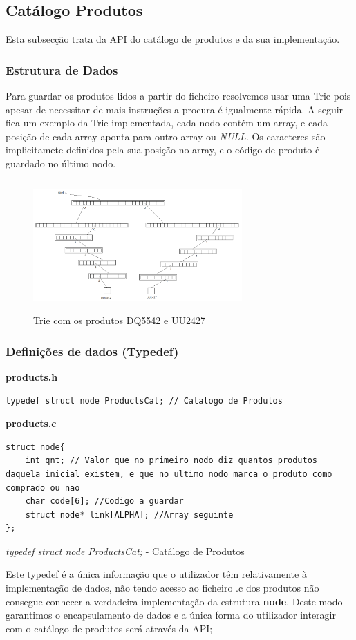 \documentclass[10pt] {article}
\begin{document}

\newpage
\subsection{Catálogo Produtos}
\par Esta subsecção trata da API do catálogo de produtos e da sua implementação.

\subsubsection{Estrutura de Dados}
\par
Para guardar os produtos lidos a partir do ficheiro resolvemos usar uma Trie pois apesar de necessitar de mais instruções a procura é igualmente rápida. A seguir fica um exemplo da Trie implementada, cada nodo contém um array, e cada posição de cada array aponta para outro array ou \emph{NULL}. Os caracteres são implicitamete definidos pela sua posição no array, e o código de produto é guardado no último nodo.


\begin{figure}[ht!]
\centering
\includegraphics[width=80mm, height=50mm]{trie2.png}
\caption{Trie com os produtos DQ5542 e UU2427}
\end{figure}

\subsubsection{Definições de dados (Typedef)}

\textbf{products.h}
\begin{lstlisting}
typedef struct node ProductsCat; // Catalogo de Produtos
\end{lstlisting}
\textbf{products.c}
\begin{lstlisting}
struct node{
	int qnt; // Valor que no primeiro nodo diz quantos produtos daquela inicial existem, e que no ultimo nodo marca o produto como comprado ou nao
	char code[6]; //Codigo a guardar
	struct node* link[ALPHA]; //Array seguinte
};
\end{lstlisting}
\emph{typedef struct node ProductsCat;} - Catálogo de Produtos
\par Este typedef é a única informação que o utilizador têm relativamente à implementação de dados, não tendo 
acesso ao ficheiro .c dos produtos não consegue conhecer a verdadeira implementação da estrutura \textbf{node}. 
Deste modo garantimos o encapsulamento de dados e a única forma do utilizador interagir com o catálogo de 
produtos será através da API;
\end{document}
